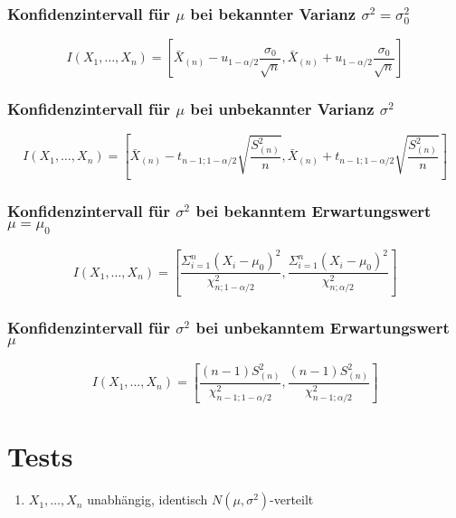 \documentclass[
ngerman,
accentcolor=9c,%
type=intern,
marginpar=false
]{tudapub}
\begin{document}
            \subsubsection*{Konfidenzintervall für $\mu$ bei bekannter Varianz $\sigma^2 = \sigma_0^2$}
            \begin{equation*}
                I(X_1,\dots,X_n)=\left[
                \bar{X}_{(n)}-u_{1-\alpha/2}\dfrac{\sigma_0}{\sqrt{n}}
                ,
                \bar{X}_{(n)}+u_{1-\alpha/2}\dfrac{\sigma_0}{\sqrt{n}}
                \right]
            \end{equation*}

            \subsubsection*{Konfidenzintervall für $\mu$ bei unbekannter Varianz $\sigma^2$}
            \begin{equation*}
                I(X_1,\dots,X_n)=\left[
                \bar{X}_{(n)}-t_{n-1;1-\alpha/2}\sqrt{\dfrac{S^2_{(n)}}{n}}
                ,
                \bar{X}_{(n)}+t_{n-1;1-\alpha/2}\sqrt{\dfrac{S^2_{(n)}}{n}}
                \right]
            \end{equation*}
            \subsubsection*{Konfidenzintervall für $\sigma^2$ bei bekanntem Erwartungswert $\mu = \mu_0$}
            \begin{equation*}
                I(X_1,\dots,X_n)=\left[
                \dfrac{\Sigma_{i=1}^n (X_i-\mu_0)^2}{\chi^2_{n;1-\alpha/2}}
                ,
                \dfrac{\Sigma_{i=1}^n (X_i-\mu_0)^2}{\chi^2_{n;\alpha/2}}
                \right]
            \end{equation*}
            \subsubsection*{Konfidenzintervall für $\sigma^2$ bei unbekanntem Erwartungswert $\mu$}
            \begin{equation*}
                I(X_1,\dots,X_n)=\left[
                \dfrac{(n-1)S^2_{(n)}}{\chi^2_{n-1;1-\alpha/2}}
                ,
                \dfrac{(n-1)S^2_{(n)}}{\chi^2_{n-1;\alpha/2}}
                \right]
            \end{equation*}
    \newpage
    \section{Tests}
        \begin{enumerate}
            \item $X_1,\dots,X_n$ unabhängig, identisch $N(\mu, \sigma^2)$-verteilt
        \end{enumerate}
\end{document}
